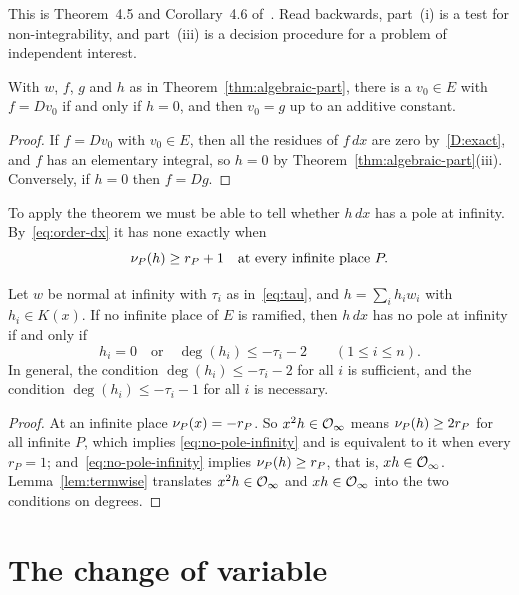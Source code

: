 This is Theorem~4.5 and Corollary~4.6 of~\cite{trager1984}. Read backwards,
part~(i) is a test for non-integrability, and part~(iii) is a decision
procedure for a problem of independent interest.

\begin{corollary}[integration in $E$]\label{cor:in-field}
With $w$, $f$, $g$ and $h$ as in Theorem~\ref{thm:algebraic-part}, there is a
$v_0 \in E$ with $f = Dv_0$ if and only if $h = 0$, and then $v_0 = g$ up to
an additive constant.
\end{corollary}

\begin{proof}
If $f = Dv_0$ with $v_0 \in E$, then all the residues of $f\,dx$ are zero
by~\ref{D:exact}, and $f$ has an elementary integral, so $h = 0$ by
Theorem~\ref{thm:algebraic-part}(iii). Conversely, if $h = 0$ then $f = Dg$.
\end{proof}

To apply the theorem we must be able to tell whether $h\,dx$ has a pole at
infinity. By~\eqref{eq:order-dx} it has none exactly when
\begin{equation}\label{eq:no-pole-infinity}
  \nu_{P}(h) \ge r_P + 1 \quad \text{at every infinite place } P .
\end{equation}

\begin{lemma}\label{lem:pole-test}
Let $w$ be normal at infinity with $\tau_i$ as in~\eqref{eq:tau}, and $h =
\sum_i h_i w_i$ with $h_i \in K(x)$. If no infinite place of $E$ is
ramified, then $h\,dx$ has no pole at infinity if and only if
\[
  h_i = 0 \quad\text{or}\quad \deg(h_i) \le -\tau_i - 2
  \qquad (1 \le i \le n).
\]
In general, the condition $\deg(h_i) \le -\tau_i - 2$ for all $i$ is
sufficient, and the condition $\deg(h_i) \le -\tau_i - 1$ for all $i$ is
necessary.
\end{lemma}

\begin{proof}
At an infinite place $\nu_{P}(x) = -r_P$. So $x^2 h \in \mathcal{O}_\infty$ means
$\nu_{P}(h) \ge 2 r_P$ for all infinite $P$, which implies
\eqref{eq:no-pole-infinity} and is equivalent to it when every $r_P = 1$;
and~\eqref{eq:no-pole-infinity} implies $\nu_{P}(h) \ge r_P$, that is, $x h
\in \mathcal{O}_\infty$. Lemma~\ref{lem:termwise} translates $x^2 h \in \mathcal{O}_\infty$
and $x h \in \mathcal{O}_\infty$ into the two conditions on degrees.
\end{proof}

\section{The change of variable}\label{sec:algpart-change}

